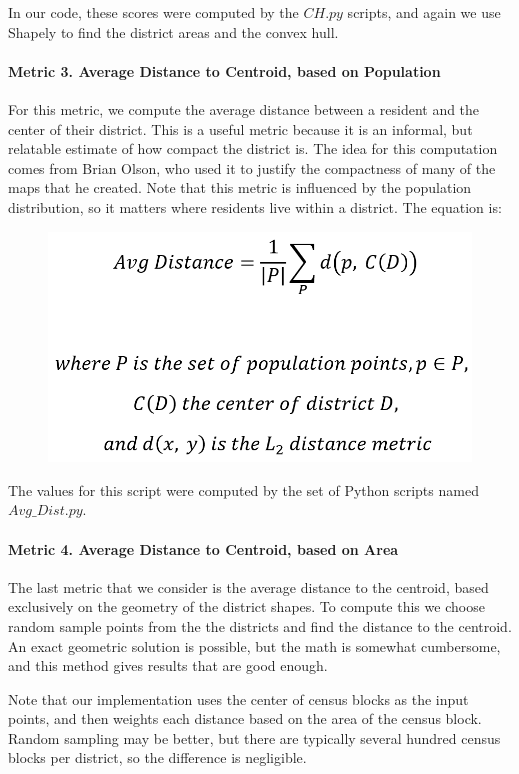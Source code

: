 \documentclass[11pt]{article}
\begin{document}
In our code, these scores were computed by the $CH.py$ scripts, and again we use Shapely to find the district areas and the convex hull.

\paragraph{Metric 3. Average Distance to Centroid, based on Population}

For this metric, we compute the average distance between a resident and the center of their district. This is a useful metric because it is an informal, but relatable estimate of how compact the district is. The idea for this computation comes from Brian Olson, who used it to justify the compactness of many of the maps that he created. Note that this metric is influenced by the population distribution, so it matters where residents live within a district. The equation is:
\begin{figure}[H]
	\centering
	\includegraphics[width=.2\textwidth]{avgdisteq}
	\label{fig:avgdisteq}
\end{figure}

The values for this script were computed by the set of Python scripts named $Avg\_Dist.py$.

\paragraph{Metric 4. Average Distance to Centroid, based on Area}

The last metric that we consider is the average distance to the centroid, based exclusively on the geometry of the district shapes. To compute this we choose random sample points from the the districts and find the distance to the centroid. An exact geometric solution is possible, but the math is somewhat cumbersome, and this method gives results that are good enough.

\medskip

Note that our implementation uses the center of census blocks as the input points, and then weights each distance based on the area of the census block. Random sampling may be better, but there are typically several hundred census blocks per district, so the difference is negligible.

\medskip
\end{document}
